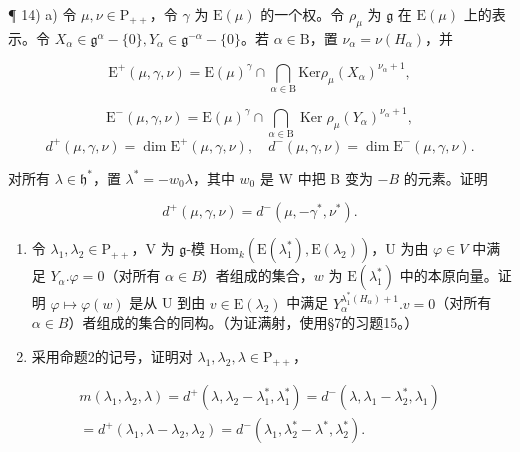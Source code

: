 ¶ 14) a) 令 \(\mu, \nu \in \mathrm{P}_{++}\)，令 \(\gamma\) 为 \(\mathrm{E}(\mu)\) 的一个权。令 \(\rho_{\mu}\) 为 \(\mathfrak{g}\) 在 \(\mathrm{E}(\mu)\) 上的表示。令 \(X_{\alpha} \in \mathfrak{g}^{\alpha} - \{0\}, Y_{\alpha} \in \mathfrak{g}^{-\alpha} - \{0\}\)。若 \(\alpha \in \mathrm{B}\)，置 \(\nu_{\alpha} = \nu(H_{\alpha})\)，并

\[
\mathrm{E} ^ {+} (\mu , \gamma , \nu) = \mathrm{E} (\mu) ^ {\gamma} \cap \bigcap_ {\alpha \in \mathrm{B}} \mathrm{Ker} \rho_ {\mu} (X _ {\alpha}) ^ {\nu_ {\alpha} + 1},
\]

\[
\mathrm{E} ^ {-} (\mu , \gamma , \nu) = \mathrm{E} (\mu) ^ {\gamma} \cap \bigcap_ {\alpha \in \mathrm{B}} \operatorname{Ker} \rho_ {\mu} (Y _ {\alpha}) ^ {\nu_ {\alpha} + 1},
\]
\relax{}
\[
d ^ {+} (\mu , \gamma , \nu) = \dim \mathrm{E} ^ {+} (\mu , \gamma , \nu), \quad d ^ {-} (\mu , \gamma , \nu) = \dim \mathrm{E} ^ {-} (\mu , \gamma , \nu).
\]

对所有 \(\lambda \in \mathfrak{h}^*\)，置 \(\lambda^{*} = -w_{0}\lambda\)，其中 \(w_{0}\) 是 W 中把 B 变为 \(-B\) 的元素。证明

\[
d ^ {+} (\mu , \gamma , \nu) = d ^ {-} (\mu , - \gamma^ {*}, \nu^ {*}).
\]

\begin{enumerate}
\def\labelenumi{\alph{enumi})}
\setcounter{enumi}{1}
\item
  令 \(\lambda_1, \lambda_2 \in \mathrm{P}_{++}\)，V 为 \(\mathfrak{g}\)-模 \(\mathrm{Hom}_k(\mathrm{E}(\lambda_1^*), \mathrm{E}(\lambda_2))\)，U 为由 \(\varphi \in V\) 中满足 \(Y_\alpha. \varphi = 0\)（对所有 \(\alpha \in B\)）者组成的集合，\(w\) 为 \(\mathrm{E}(\lambda_1^*)\) 中的本原向量。证明 \(\varphi \mapsto \varphi(w)\) 是从 U 到由 \(v \in \mathrm{E}(\lambda_2)\) 中满足 \(Y_\alpha^{\lambda_1^*(H_\alpha)+1}. v = 0\)（对所有 \(\alpha \in B\)）者组成的集合的同构。（为证满射，使用§7的习题15。）
\item
  采用命题2的记号，证明对 \(\lambda_1, \lambda_2, \lambda \in \mathrm{P}_{++}\)，
\end{enumerate}

\[
\begin{array}{r} m (\lambda_ {1}, \lambda_ {2}, \lambda) = d ^ {+} (\lambda , \lambda_ {2} - \lambda_ {1} ^ {*}, \lambda_ {1} ^ {*}) = d ^ {-} (\lambda , \lambda_ {1} - \lambda_ {2} ^ {*}, \lambda_ {1}) \\ = d ^ {+} (\lambda_ {1}, \lambda - \lambda_ {2}, \lambda_ {2}) = d ^ {-} (\lambda_ {1}, \lambda_ {2} ^ {*} - \lambda^ {*}, \lambda_ {2} ^ {*}). \end{array}
\]

